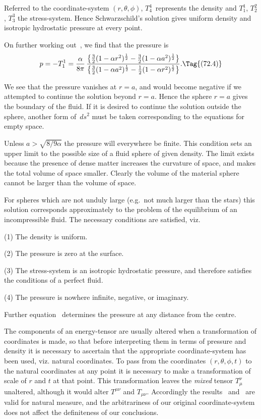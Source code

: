 \documentclass[12pt]{book}
\begin{document}
Referred to the coordinate-system $(r, \theta, \phi)$, $T_{4}^{4}$~represents the density and
$T_{1}^{1}$, $T_{2}^{2}$, $T_{3}^{3}$ the stress-system. Hence Schwarzschild's solution gives uniform
density and isotropic hydrostatic pressure at every point.
%

On further working out~, we find that the pressure is
\[
p = -T_{1}^{1}
= \frac{\alpha}{8\pi}\,
\frac{\bigl\{\frac{3}{2}(1 - \alpha r^{2})^{\frac{1}{2}} - \frac{3}{2}(1 - \alpha a^{2})^{\frac{1}{2}}\bigr\}}
     {\bigl\{\frac{3}{2}(1 - \alpha a^{2})^{\frac{1}{2}} - \frac{1}{2}(1 - \alpha r^{2})^{\frac{1}{2}}\bigr\}}.
\Tag{(72.4)}
\]

We see that the pressure vanishes at $r = a$, and would become negative if
we attempted to continue the solution beyond $r = a$. Hence the sphere $r = a$
gives the boundary of the fluid. If it is desired to continue the solution outside
the sphere, another form of~$ds^{2}$ must be taken corresponding to the
equations for empty space.

Unless $a > \sqrt{8/9\alpha}$ the pressure will everywhere be finite. This condition
sets an upper limit to the possible size of a fluid sphere of given density. The
limit exists because the presence of dense matter increases the curvature of
space, and makes the total volume of space smaller. Clearly the volume of the
material sphere cannot be larger than the volume of space.

For spheres which are not unduly large (e.g.\ not much larger than the
stars) this solution corresponds approximately to the problem of the equilibrium
of an incompressible fluid. The necessary conditions are satisfied, viz.\

(1) The density is uniform.

(2) The pressure is zero at the surface.

(3) The stress-system is an isotropic hydrostatic pressure, and therefore
satisfies the conditions of a perfect fluid.

(4) The pressure is nowhere infinite, negative, or imaginary.

Further equation~ determines the pressure at any distance from the
centre.

The components of an energy-tensor are usually altered when a transformation of coordinates is made, so that before
interpreting them in terms of pressure and density it is necessary to ascertain that the appropriate coordinate-system
has been used, viz. natural coordinates.
To pass from the coordinates $(r,\theta,\phi,t)$ to the natural coordinates at any point it is necessary to make a
transformation of scale of $r$ and $t$ at that point.
This transformation leaves the \emph{mixed} tensor $T_{\mu}^{\nu}$ unaltered, although it would alter $T^{\mu\nu}$
and $T_{\mu\nu}$.
Accordingly the results~ and~ are valid for natural measure, and the arbitrariness of our
original coordinate-system does not affect the definiteness of our conclusions.
\end{document}

